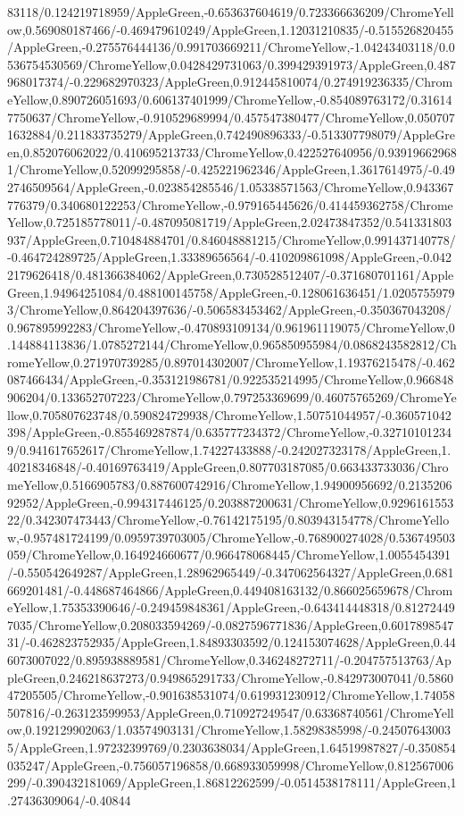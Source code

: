 {\begin{tikzternal}
83118/0.124219718959/AppleGreen,-0.653637604619/0.723366636209/ChromeYellow,0.569080187466/-0.469479610249/AppleGreen,1.12031210835/-0.515526820455/AppleGreen,-0.275576444136/0.991703669211/ChromeYellow,-1.04243403118/0.0536754530569/ChromeYellow,0.0428429731063/0.399429391973/AppleGreen,0.487968017374/-0.229682970323/AppleGreen,0.912445810074/0.274919236335/ChromeYellow,0.890726051693/0.606137401999/ChromeYellow,-0.854089763172/0.316147750637/ChromeYellow,-0.910529689994/0.457547380477/ChromeYellow,0.0507071632884/0.211833735279/AppleGreen,0.742490896333/-0.513307798079/AppleGreen,0.852076062022/0.410695213733/ChromeYellow,0.422527640956/0.939196629681/ChromeYellow,0.52099295858/-0.425221962346/AppleGreen,1.3617614975/-0.492746509564/AppleGreen,-0.023854285546/1.05338571563/ChromeYellow,0.943367776379/0.340680122253/ChromeYellow,-0.979165445626/0.414459362758/ChromeYellow,0.725185778011/-0.487095081719/AppleGreen,2.02473847352/0.541331803937/AppleGreen,0.710484884701/0.846048881215/ChromeYellow,0.991437140778/-0.464724289725/AppleGreen,1.33389656564/-0.410209861098/AppleGreen,-0.0422179626418/0.481366384062/AppleGreen,0.730528512407/-0.371680701161/AppleGreen,1.94964251084/0.488100145758/AppleGreen,-0.128061636451/1.02057559793/ChromeYellow,0.864204397636/-0.506583453462/AppleGreen,-0.350367043208/0.967895992283/ChromeYellow,-0.470893109134/0.961961119075/ChromeYellow,0.144884113836/1.0785272144/ChromeYellow,0.965850955984/0.0868243582812/ChromeYellow,0.271970739285/0.897014302007/ChromeYellow,1.19376215478/-0.462087466434/AppleGreen,-0.353121986781/0.922535214995/ChromeYellow,0.966848906204/0.133652707223/ChromeYellow,0.797253369699/0.46075765269/ChromeYellow,0.705807623748/0.590824729938/ChromeYellow,1.50751044957/-0.360571042398/AppleGreen,-0.855469287874/0.635777234372/ChromeYellow,-0.327101012349/0.941617652617/ChromeYellow,1.74227433888/-0.242027323178/AppleGreen,1.40218346848/-0.40169763419/AppleGreen,0.807703187085/0.663433733036/ChromeYellow,0.5166905783/0.887600742916/ChromeYellow,1.94900956692/0.213520692952/AppleGreen,-0.994317446125/0.203887200631/ChromeYellow,0.929616155322/0.342307473443/ChromeYellow,-0.76142175195/0.803943154778/ChromeYellow,-0.957481724199/0.0959739703005/ChromeYellow,-0.768900274028/0.536749503059/ChromeYellow,0.164924660677/0.966478068445/ChromeYellow,1.0055454391/-0.550542649287/AppleGreen,1.28962965449/-0.347062564327/AppleGreen,0.681669201481/-0.448687464866/AppleGreen,0.449408163132/0.866025659678/ChromeYellow,1.75353390646/-0.249459848361/AppleGreen,-0.643414448318/0.812724497035/ChromeYellow,0.208033594269/-0.0827596771836/AppleGreen,0.601789854731/-0.462823752935/AppleGreen,1.84893303592/0.124153074628/AppleGreen,0.446073007022/0.895938889581/ChromeYellow,0.346248272711/-0.204757513763/AppleGreen,0.246218637273/0.949865291733/ChromeYellow,-0.842973007041/0.586047205505/ChromeYellow,-0.901638531074/0.619931230912/ChromeYellow,1.74058507816/-0.263123599953/AppleGreen,0.710927249547/0.63368740561/ChromeYellow,0.192129902063/1.03574903131/ChromeYellow,1.58298385998/-0.245076430035/AppleGreen,1.97232399769/0.2303638034/AppleGreen,1.64519987827/-0.350854035247/AppleGreen,-0.756057196858/0.668933059998/ChromeYellow,0.812567006299/-0.390432181069/AppleGreen,1.86812262599/-0.0514538178111/AppleGreen,1.27436309064/-0.40844
\end{tikzternal}}
